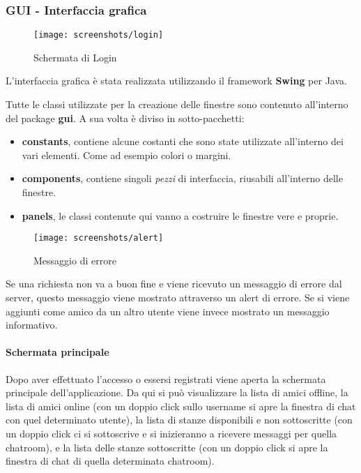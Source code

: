 \subsubsection{GUI - Interfaccia grafica}
\begin{wrapfigure}[10]{r}{0.4\textwidth}
\caption*{{\scriptsize Schermata di Login}}
\centering
\texttt{[image: screenshots/login]}
\end{wrapfigure}

L'interfaccia grafica è stata realizzata utilizzando il framework \textbf{Swing} per Java.

Tutte le classi utilizzate per la creazione delle finestre sono contenuto all'interno del package \textbf{gui}. A sua volta è diviso in sotto-pacchetti:
\begin{itemize}
    \item \textbf{constants}, contiene alcune costanti che sono state utilizzate all'interno dei vari elementi. Come ad esempio colori o margini.
    \item \textbf{components}, contiene singoli \textit{pezzi} di interfaccia, riusabili all'interno delle finestre.
    \item \textbf{panels}, le classi contenute qui vanno a costruire le finestre vere e proprie.
\end{itemize}


\begin{wrapfigure}[7]{l}{0.35\textwidth}
\caption*{{\scriptsize Messaggio di errore}}
\centering
\texttt{[image: screenshots/alert]}
\end{wrapfigure}

Se una richiesta non va a buon fine e viene ricevuto un messaggio di errore dal server, questo messaggio viene mostrato attraverso un alert di errore. Se si viene aggiunti come amico da un altro utente viene invece mostrato un messaggio informativo.

\paragraph{Schermata principale}
Dopo aver effettuato l'accesso o essersi registrati viene aperta la schermata principale dell'applicazione. Da qui si può visualizzare la lista di amici offline, la lista di amici online (con un doppio click sullo username si apre la finestra di chat con quel determinato utente), la lista di stanze disponibili e non sottoscritte (con un doppio click ci si sottoscrive e si inizieranno a ricevere messaggi per quella chatroom), e la lista delle stanze sottoscritte (con un doppio click si apre la finestra di chat di quella determinata chatroom).

